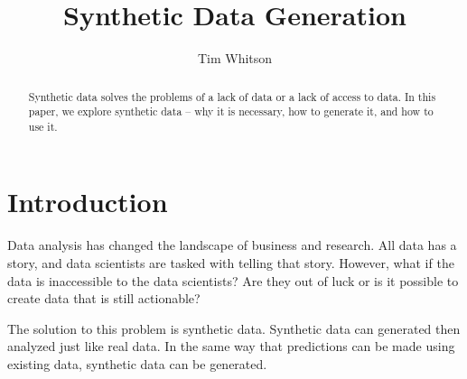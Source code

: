 \title{Synthetic Data Generation}

\author{Tim Whitson}

\renewcommand{\shortauthors}{T. Whitson}

\begin{abstract}
Synthetic data solves the problems of a lack of data or a lack of access to data. In this paper, we explore synthetic data -- why it is necessary, how to generate it, and how to use it.
\end{abstract}


\maketitle

\section{Introduction}

Data analysis has changed the landscape of business and research. All data has a story, and data scientists are tasked with telling that story. However, what if the data is inaccessible to the data scientists? Are they out of luck or is it possible to create data that is still actionable?

The solution to this problem is synthetic data. Synthetic data can generated then analyzed just like real data. In the same way that predictions can be made using existing data, synthetic data can be generated.




 

